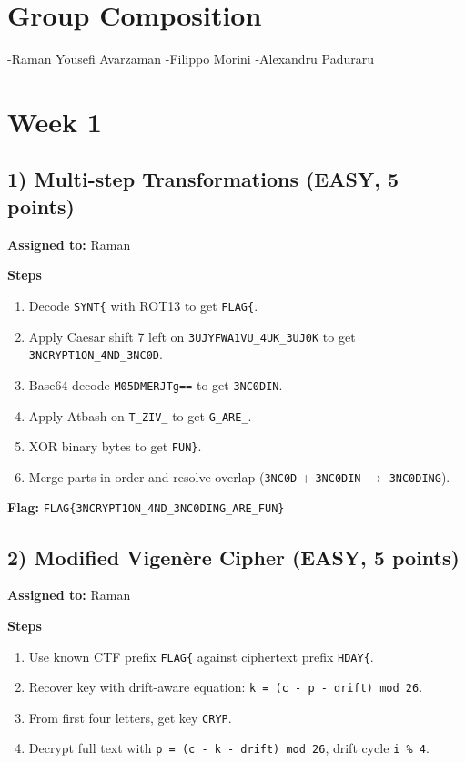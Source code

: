 \documentclass[10pt,a4paper]{article}
\begin{document}
\section{Group Composition}
-Raman Yousefi Avarzaman
-Filippo Morini
-Alexandru Paduraru
\section{Week 1}

\subsection*{1) Multi-step Transformations (EASY, 5 points)}
\textbf{Assigned to:} Raman

\textbf{Steps}
\begin{enumerate}[leftmargin=*,noitemsep]
  \item Decode \texttt{SYNT\{} with ROT13 to get \texttt{FLAG\{}.
  \item Apply Caesar shift 7 left on \texttt{3UJYFWA1VU\_4UK\_3UJ0K} to get \texttt{3NCRYPT1ON\_4ND\_3NC0D}.
  \item Base64-decode \texttt{M05DMERJTg==} to get \texttt{3NC0DIN}.
  \item Apply Atbash on \texttt{T\_ZIV\_} to get \texttt{G\_ARE\_}.
  \item XOR binary bytes to get \texttt{FUN\}}.
  \item Merge parts in order and resolve overlap (\texttt{3NC0D} + \texttt{3NC0DIN} $\rightarrow$ \texttt{3NC0DING}).
\end{enumerate}

\textbf{Flag:} \texttt{FLAG\{3NCRYPT1ON\_4ND\_3NC0DING\_ARE\_FUN\}}

\subsection*{2) Modified Vigen\`ere Cipher (EASY, 5 points)}
\textbf{Assigned to:} Raman

\textbf{Steps}
\begin{enumerate}[leftmargin=*,noitemsep]
  \item Use known CTF prefix \texttt{FLAG\{} against ciphertext prefix \texttt{HDAY\{}.
  \item Recover key with drift-aware equation: \texttt{k = (c - p - drift) mod 26}.
  \item From first four letters, get key \texttt{CRYP}.
  \item Decrypt full text with \texttt{p = (c - k - drift) mod 26}, drift cycle \texttt{i \% 4}.
\end{enumerate}
\end{document}
